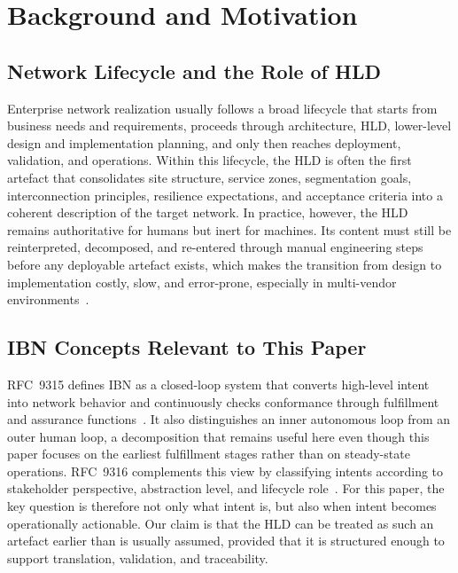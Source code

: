 \documentclass[conference]{IEEEtran}
\begin{document}
\section{Background and Motivation}

\subsection{Network Lifecycle and the Role of HLD}

Enterprise network realization usually follows a broad lifecycle that starts from business needs and requirements, proceeds through architecture, HLD, lower-level design and implementation planning, and only then reaches deployment, validation, and operations. Within this lifecycle, the HLD is often the first artefact that consolidates site structure, service zones, segmentation goals, interconnection principles, resilience expectations, and acceptance criteria into a coherent description of the target network. In practice, however, the HLD remains authoritative for humans but inert for machines. Its content must still be reinterpreted, decomposed, and re-entered through manual engineering steps before any deployable artefact exists, which makes the transition from design to implementation costly, slow, and error-prone, especially in multi-vendor environments~\cite{drakopoulos1999enterprise,enck2007configuration,sung2008towards}.

\subsection{IBN Concepts Relevant to This Paper}

RFC~9315 defines IBN as a closed-loop system that converts high-level intent into network behavior and continuously checks conformance through fulfillment and assurance functions~\cite{rfc9315}. It also distinguishes an inner autonomous loop from an outer human loop, a decomposition that remains useful here even though this paper focuses on the earliest fulfillment stages rather than on steady-state operations. RFC~9316 complements this view by classifying intents according to stakeholder perspective, abstraction level, and lifecycle role~\cite{rfc9316}. For this paper, the key question is therefore not only what intent is, but also when intent becomes operationally actionable. Our claim is that the HLD can be treated as such an artefact earlier than is usually assumed, provided that it is structured enough to support translation, validation, and traceability.
\end{document}
